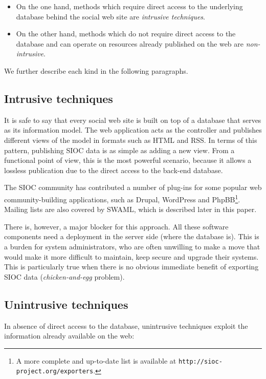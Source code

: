 \documentclass{../templates/www2008-submission}
\begin{document}
\begin{itemize}
\item On the one hand, methods which require direct access to the underlying database behind
the social web site are \emph{intrusive techniques}.
\item On the other hand, methods which do not require direct access to
the database and can operate on resources already published on the web
are \emph{non-intrusive}.
\end{itemize}

We further describe each kind in the following paragraphs.

\subsection{Intrusive techniques}

It is safe to say that every social web site is built on top of a
database that serves as its information model. The web application
acts as the controller and publishes different views of the model in
formats such as HTML and RSS. In terms of this pattern, publishing
SIOC data is as simple as adding a new view.
From a functional point of view, this is the most powerful scenario, because
it allows a lossless publication due to the direct access
to the back-end database.

The SIOC community has contributed a number of plug-ins for some
popular web community-building applications, such as Drupal, WordPress and 
PhpBB\footnote{A more complete and up-to-date list is available
at \texttt{http://sioc-project.org/exporters}.}. Mailing lists are
also covered by SWAML, which is described later in this paper.

There is, however, a major blocker for this approach. All these
software components need a deployment in the server side (where
the database is). This is a burden for system administrators, who
are often unwilling to make a move that would make it more difficult to
maintain, keep secure and upgrade their systems. This is particularly
true when there is no obvious immediate benefit of exporting
SIOC data (\emph{chicken-and-egg} problem).

\subsection{Unintrusive techniques}

In absence of direct access to the database, unintrusive
techniques exploit the information already available on the web:
\end{document}
